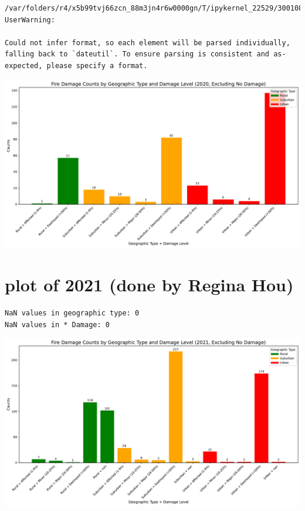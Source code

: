 \documentclass[
  letterpaper,
  DIV=11,
  numbers=noendperiod]{scrartcl}
\begin{document}
\begin{verbatim}
/var/folders/r4/x5b99tvj66zcn_88m3jn4r6w0000gn/T/ipykernel_22529/3001088990.py:3: UserWarning:

Could not infer format, so each element will be parsed individually, falling back to `dateutil`. To ensure parsing is consistent and as-expected, please specify a format.
\end{verbatim}

\includegraphics{Final Writeup_files/figure-pdf/cell-12-output-2.pdf}

\section{plot of 2021 (done by Regina
Hou)}\label{plot-of-2021-done-by-regina-hou}

\begin{verbatim}
NaN values in geographic type: 0
NaN values in * Damage: 0
\end{verbatim}

\includegraphics{Final Writeup_files/figure-pdf/cell-14-output-1.pdf}
\end{document}
